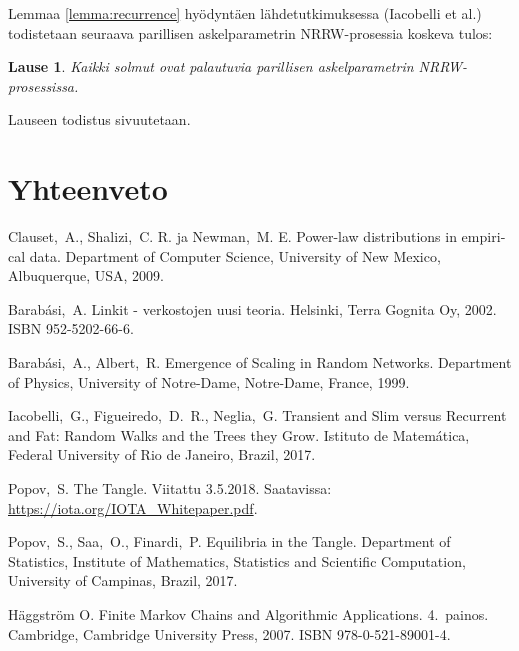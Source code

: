 \documentclass[finnish, 12pt, a4paper, sci, utf8, pdfa]{aaltothesis}
\newtheorem{theorem}{Lause}
\begin{document}
Lemmaa \ref{lemma:recurrence} hyödyntäen lähdetutkimuksessa (Iacobelli et al.) todistetaan seuraava parillisen askelparametrin NRRW-prosessia koskeva tulos:
\begin{theorem}
Kaikki solmut ovat palautuvia parillisen askelparametrin NRRW-prosessissa.
\end{theorem}
Lauseen todistus sivuutetaan. \cite{Iacobelli}

\section{Yhteenveto}

\clearpage

\thesisbibliography

\begin{thebibliography}{99}

 Clauset,\ A., Shalizi,\ C. R. ja Newman,\ M. E. 
   \foreignlanguage{english}{Power-law distributions in empirical data.} 
   Department of Computer Science, University of New Mexico, Albuquerque, USA, 2009.

 Barabási,\ A. Linkit - verkostojen uusi teoria. 
   Helsinki, Terra Gognita Oy, 2002. ISBN 952-5202-66-6. 

 Barabási,\ A., Albert,\ R.
   \foreignlanguage{english}{Emergence of Scaling in Random Networks.} 
   Department of Physics, University of Notre-Dame, Notre-Dame, France, 1999.

 Iacobelli,\ G., Figueiredo,\ D.\ R., Neglia,\ G. 
   \foreignlanguage{english}{Transient and Slim versus Recurrent and Fat: Random Walks and the Trees they Grow.} 
   Istituto de Matemática, Federal University of Rio de Janeiro, Brazil, 2017.

 Popov,\ S. The Tangle. Viitattu 3.5.2018. Saatavissa: \url{https://iota.org/IOTA_Whitepaper.pdf}.

 Popov,\ S., Saa,\ O., Finardi,\ P. 
   \foreignlanguage{english}{Equilibria in the Tangle.} 
   Department of Statistics, Institute of Mathematics, Statistics and Scientific Computation, University of Campinas, Brazil, 2017.

 Häggström O.
   \foreignlanguage{english}{Finite Markov Chains and Algorithmic Applications.} 
   4.\ painos. Cambridge, Cambridge University Press, 2007. ISBN 978-0-521-89001-4.

\end{thebibliography}
\end{document}
